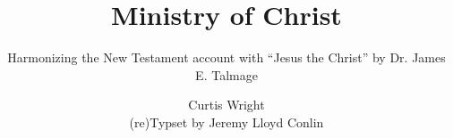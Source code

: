 \documentclass[8pt]{scrartcl}
\title{Ministry of Christ}
\subtitle{Harmonizing the New Testament account with ``Jesus the Christ'' by Dr. James E. Talmage}
\author{\Huge Curtis Wright\\\small (re)Typset by Jeremy Lloyd Conlin}
\date{}
\begin{document}
\pagestyle{empty}
\maketitle


\begin{landscape}

\end{landscape}
\end{document}

